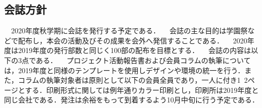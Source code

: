 \subsection*{会誌方針}

　2020年度秋学期に会誌を発行する予定である．
　会誌の主な目的は学園祭などで配布し，本会の活動及びその成果を会外へ発信することである．
　2020年度は2019年度の発行部数と同じく100部の配布を目標とする．
　会誌の内容は以下の3点である．
　プロジェクト活動報告書および会員コラムの執筆については，2019年度と同様のテンプレートを使用しデザインや環境の統一を行う．また，コラムの執筆対象者は原則として\thirdGrade{}以下の会員全員であり，一人に付き1~2ページとする．印刷形式に関しては例年通りカラー印刷とし，印刷所は2019年度と同じ会社である．発注は余裕をもって到着するよう10月中旬に行う予定である．

